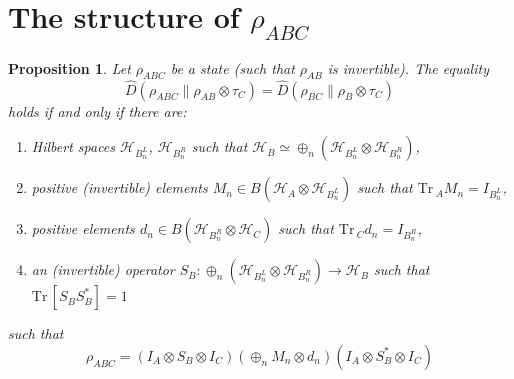 \documentclass[12pt]{article}
\newtheorem{prop}{Proposition}
\theoremstyle{definition}
\theoremstyle{remark}
\def\Ha{\mathcal H}
\def \Tr{\mathrm{Tr}\,}
\begin{document}
\section{The structure of $\rho_{ABC}$}


\begin{prop} Let $\rho_{ABC}$ be a state (such that $\rho_{AB}$ is invertible). The equality
\begin{equation}\label{eq:eqm}
\hat D(\rho_{ABC}\|\rho_{AB}\otimes \tau_C)=\hat D(\rho_{BC}\|\rho_B\otimes  \tau_C)
\end{equation}
holds if and only if there are:
\begin{enumerate}
\item [(i)]Hilbert spaces $\Ha_{B^L_n}$, $\Ha_{B^R_n}$ such that 
$\Ha_B\simeq \oplus_n(\Ha_{B^L_n}\otimes \Ha_{B^R_n})$,
\item[(ii)] positive (invertible) elements $M_n\in B(\Ha_A\otimes \Ha_{B^L_n})$ such that
$\Tr_A M_n=I_{B^L_n}$,
\item [(iii)] positive elements $d_n\in B(\Ha_{B^R_n}\otimes \Ha_C)$ such that $\Tr_C
d_n=I_{B^R_n}$,
\item[(iv)] an (invertible) operator $S_B: \oplus_n (\Ha_{B^L_n}\otimes \Ha_{B^R_n})\to \Ha_B$ such
that $\Tr[S_BS_B^*]=1$
\end{enumerate}
such that
\[
\rho_{ABC}=(I_A\otimes S_B\otimes I_C)\left(\oplus_n M_n\otimes d_n \right)(I_A\otimes
S_B^*\otimes I_C)
\]

\end{prop}
\end{document}
